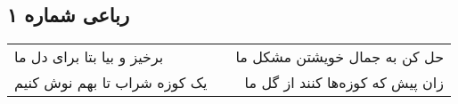 \begin{center}
\section*{رباعی شماره ۱}
\label{sec:sh001}
\begin{longtable}{l p{0.5cm} r}
برخیز و بیا بتا برای دل ما
&&
حل کن به جمال خویشتن مشکل ما
\\
یک کوزه شراب تا بهم نوش کنیم
&&
زان پیش که کوزه‌ها کنند از گل ما
\\
\end{longtable}
\end{center}

